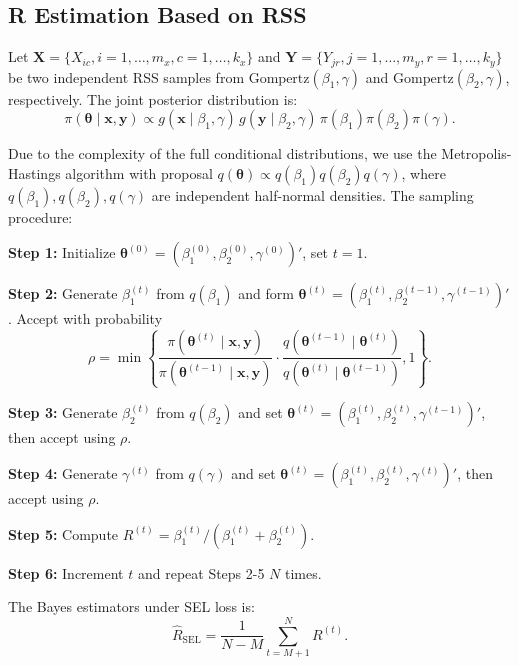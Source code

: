 \documentclass[twoside]{article}
\begin{document}
\subsection{R Estimation Based on RSS}

Let $\mathbf{X}=\{X_{ic}, i=1,\ldots,m_x, c=1,\ldots,k_x\}$ and $\mathbf{Y}=\{Y_{jr}, j=1,\ldots,m_y, r=1,\ldots,k_y\}$ be two independent RSS samples from $\text{Gompertz}(\beta_1,\gamma)$ and $\text{Gompertz}(\beta_2,\gamma)$, respectively. The joint posterior distribution is:
\[
\pi(\boldsymbol{\theta}\mid\mathbf{x},\mathbf{y})\propto g(\mathbf{x}\mid\beta_1,\gamma)\,g(\mathbf{y}\mid\beta_2,\gamma)\,\pi(\beta_1)\pi(\beta_2)\pi(\gamma).
\]

Due to the complexity of the full conditional distributions, we use the Metropolis-Hastings algorithm with proposal $q(\boldsymbol{\theta})\propto q(\beta_1)q(\beta_2)q(\gamma)$, where $q(\beta_1), q(\beta_2), q(\gamma)$ are independent half-normal densities. The sampling procedure:

\noindent\textbf{Step 1:} Initialize $\boldsymbol{\theta}^{(0)}=(\beta_1^{(0)},\beta_2^{(0)},\gamma^{(0)})'$, set $t=1$.

\noindent\textbf{Step 2:} Generate $\beta_1^{(t)}$ from $q(\beta_1)$ and form $\boldsymbol{\theta}^{(t)}=(\beta_1^{(t)},\beta_2^{(t-1)},\gamma^{(t-1)})'$. Accept with probability
\[
\rho=\min\left\{\frac{\pi(\boldsymbol{\theta}^{(t)}\mid\mathbf{x},\mathbf{y})}{\pi(\boldsymbol{\theta}^{(t-1)}\mid\mathbf{x},\mathbf{y})}\cdot\frac{q(\boldsymbol{\theta}^{(t-1)}\mid\boldsymbol{\theta}^{(t)})}{q(\boldsymbol{\theta}^{(t)}\mid\boldsymbol{\theta}^{(t-1)})},1\right\}.
\]

\noindent\textbf{Step 3:} Generate $\beta_2^{(t)}$ from $q(\beta_2)$ and set $\boldsymbol{\theta}^{(t)}=(\beta_1^{(t)},\beta_2^{(t)},\gamma^{(t-1)})'$, then accept using $\rho$.

\noindent\textbf{Step 4:} Generate $\gamma^{(t)}$ from $q(\gamma)$ and set $\boldsymbol{\theta}^{(t)}=(\beta_1^{(t)},\beta_2^{(t)},\gamma^{(t)})'$, then accept using $\rho$.

\noindent\textbf{Step 5:} Compute $R^{(t)}=\beta_1^{(t)}/(\beta_1^{(t)}+\beta_2^{(t)})$.

\noindent\textbf{Step 6:} Increment $t$ and repeat Steps 2-5 $N$ times.

The Bayes estimators under SEL loss is:
\[
\hat{R}_{\text{SEL}}=\frac{1}{N-M}\sum_{t=M+1}^N R^{(t)}.
\]
\end{document}
